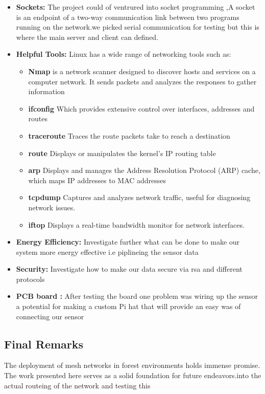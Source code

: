 \begin{itemize}
    \item \textbf{Sockets:} The project could of ventrured into socket programming ,A socket is an endpoint of a two-way communication link between two programs running on the network.we picked serial communication for testing  but this is where the main server and client can defined.
    \item \textbf{Helpful Tools:}  Linux has a wide range of networking tools such as:
    \begin{itemize}
        \item\textbf{Nmap} is a network scanner designed to discover hosts and services on a computer network. It sends packets and analyzes the responses to gather information 
        \item \textbf{ifconfig} Which provides extensive control over interfaces, addresses and routes
        \item \textbf{traceroute} Traces the route packets take to reach a destination
        \item \textbf{route} Displays or manipulates the kernel's IP routing table
        \item \textbf{arp} Displays and manages the Address Resolution Protocol (ARP) cache, which maps IP addresses to MAC addresses
        \item \textbf{tcpdump} Captures and analyzes network traffic, useful for diagnosing network issues.
        \item \textbf{iftop} Displays a real-time bandwidth monitor for network interfaces.
    \end{itemize} 
    \item \textbf{Energy Efficiency:} Investigate further what can be done to make  our system more energy effective i.e piplineing the sensor data
    \item \textbf{Security:} Investigate how to make our data secure via rsa and different protocols
    \item \textbf{PCB board :} After testing the board one problem was wiring up the sensor a potential for making a custom  Pi hat that will provide an easy was of connecting  our sensor 
 
   
\end{itemize}

\subsection{Final Remarks}
The deployment of mesh networks in forest environments holds immense promise. The work presented here serves as a solid foundation for future endeavors.into the actual routeing of the network and testing this
